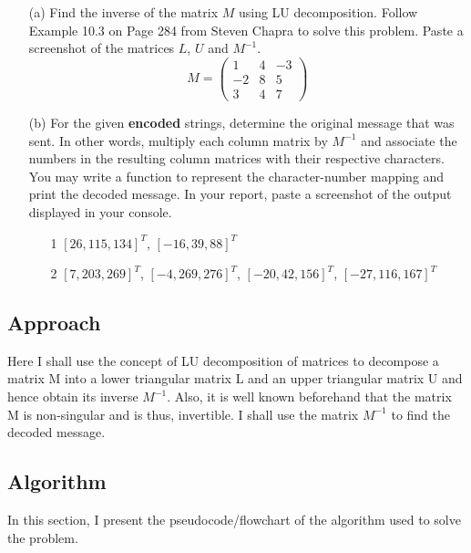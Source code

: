 \documentclass[titlepage, 11pt]{article}
\begin{document}
\begin{itemize}
    \item [(a)] Find the inverse of the matrix $M$ using LU decomposition. Follow Example 10.3 on Page 284 from Steven Chapra to solve this problem. Paste a screenshot of the matrices $L$, $U$ and $M^{-1}$. 
    \vspace{-1}
    \begin{equation*}
    M = 
    \begin{pmatrix}
     1 & 4 & -3\\
     -2 & 8 & 5\\
     3 & 4 & 7
    \end{pmatrix}
    \end{equation*}
    
    \item [(b)] For the given \textbf{encoded} strings, determine the original message that was sent. In other words, multiply each column matrix by $M^{-1}$ and associate the numbers in the resulting column matrices with their respective characters. You may write a function to represent the character-number mapping and print the decoded message. In your report, paste a screenshot of the output displayed in your console. 
    
    \begin{itemize}
        \item [1] $[26, 115, 134]^T$, $[-16, 39, 88]^T$
        \item [2] $[7, 203, 269]^T$, $[-4, 269, 276]^T$, $[-20, 42, 156]^T$, $[-27, 116, 167]^T$
    \end{itemize}
    
\end{itemize}

\subsection{Approach}

Here I shall use the concept of LU decomposition of matrices to decompose a matrix M into a lower triangular matrix L and an upper triangular matrix U and hence obtain its inverse $M^{-1}$.
Also, it is well known beforehand that the matrix M is non-singular and is thus, invertible. 
I shall use the matrix $M^{-1}$ to find the decoded message. 


\subsection{Algorithm}
In this section, I present the pseudocode/flowchart of the algorithm used to solve the problem.
\end{document}
